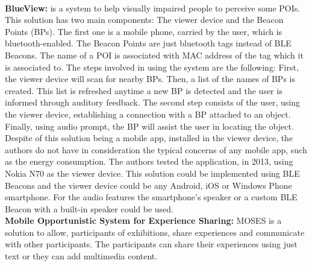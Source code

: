 \\
\textbf{BlueView:}\cite{Chen2013} is a system to help
visually impaired people to perceive some POIs.
This solution has two main components: The viewer device
and the Beacon Points (BPs). The first one is a mobile phone,
carried by the user, which is bluetooth-enabled.
The Beacon Points are just bluetooth tags instead of
BLE Beacons. The name of a POI is associated with
MAC address of the tag which it is associated to.
The steps involved in using the system are the
following: First, the viewer device will scan
for nearby BPs. Then, a list of the names of
BPs is created. This list is refreshed anytime a new
BP is detected and the user is informed through auditory
feedback. The second step consists of the user, using
the viewer device, establishing a connection with a BP
attached to an object. Finally, using audio prompt, the BP
will assist the user in locating the object.
Despite of this solution being a mobile app, installed
in the viewer device, the authors do not have in
consideration the typical concerns of any mobile app,
such as the energy consumption.
The authors tested the application, in 2013,
using Nokia N70 as the viewer device.
This solution could be implemented using BLE Beacons
and the viewer device could be any Android, iOS or
Windows Phone smartphone.
For the audio features the smartphone's speaker or
a custom BLE Beacon with a built-in speaker could be
used.
\\
\textbf{Mobile Opportunistic System for Experience Sharing:}
MOSES\cite{BenAbdesslem2014} is a solution to allow, 
participants of exhibitions, share experiences and
communicate with other participants.
The participants can share their experiences using
just text or they can add multimedia content.
